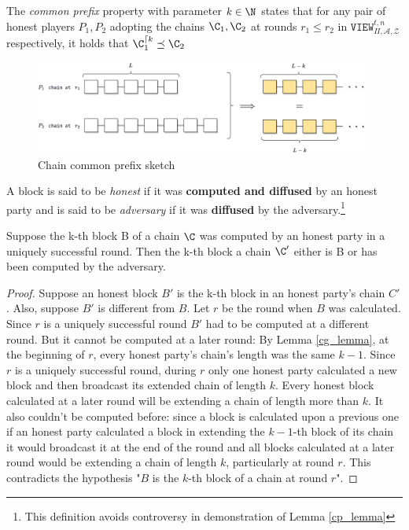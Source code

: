 \documentclass[..]{subfiles}
\begin{document}
\begin{definition}
	\normalfont
	The \textit{common prefix} property with parameter $k \in \N$ states that for any pair of honest players $P_1,P_2$ adopting the chains $\C_1,\C_2$ at rounds $r_1 \le r_2$ in $\texttt{VIEW}_{\Pi, \mathcal{A}, \mathcal{Z}}^{t, n}$ respectively, it holds that $\C_1^{\lceil k} \preceq \C_2$
\end{definition}

\begin{figure}[H]
	\begin{center}
		\includegraphics[width=0.98\textwidth]{figures/common_prefix.png}
	\end{center}
	\caption{Chain common prefix sketch}
	\label{fig:cp}
\end{figure}

\begin{definition}
	\normalfont
	A block is said to be \textit{honest} if it was \textbf{computed and diffused} by an honest party and is said to be \textit{adversary} if it was \textbf{diffused} by the adversary.\footnote{This definition avoids controversy in demonstration of Lemma \ref{cp_lemma}}
\end{definition}

\begin{lemma}\label{us_property}
	Suppose the k-th block B of a chain $\C$ was computed by an honest party in a uniquely successful round. Then the k-th block a chain $\C'$ either is B or has been computed by the adversary.
\end{lemma}
\begin{proof}
	Suppose an honest block $B'$ is the k-th block in an honest party's chain $C'$. Also, suppose $B'$ is different from $B$. Let $r$ be the round when $B$ was calculated. Since $r$ is a uniquely successful round $B'$ had to be computed at a different round. But it cannot be computed at a later round: By Lemma \ref{cg_lemma}, at the beginning of $r$, every honest party's chain's length was the same $k-1$. Since $r$ is a uniquely successful round, during $r$ only one honest party calculated a new block and then broadcast its extended chain of length $k$. Every honest block calculated at a later round will be extending a chain of length more than $k$. It also couldn't be computed before: since a block is calculated upon a previous one if an honest party calculated a block in extending the $k-1$-th block of its chain it would broadcast it at the end of the round and all blocks calculated at a later round would be extending a chain of length $k$, particularly at round $r$. This contradicts the hypothesis "$B$ is the $k$-th block of a chain at round $r$".
\end{proof}
\end{document}
